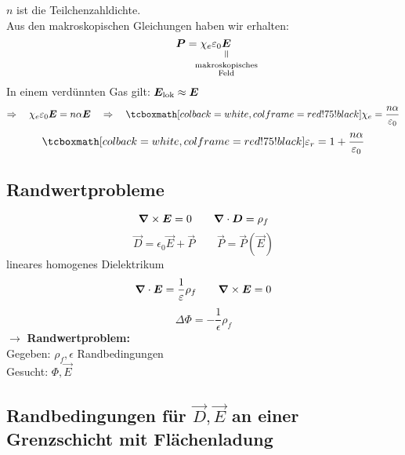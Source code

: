 \noindent
$ n $ ist die Teilchenzahldichte.\\
Aus den makroskopischen Gleichungen haben wir erhalten:
\begin{equation*}
\vec{P} = \chi_e \epsilon_0 \equalto{\vec{E}}{\mathclap{ \substack{\tx{makroskopisches} \\ \tx{Feld} }}}
\end{equation*}
In einem verdünnten Gas gilt: $ \bm{E}_{\textrm{lok}} \approx \bm{E} $
\begin{equation*}
\Rightarrow \quad \chi_e \epsilon_0 \vec{E} = n \alpha \vec{E} \quad \Rightarrow \quad \rmbox{\chi_e = \frac{n \alpha}{\epsilon_0}}
\end{equation*}
\begin{equation*}
\rmbox{\epsilon_r = 1 + \frac{n \alpha}{\epsilon_0}}
\end{equation*}

\subsection{Randwertprobleme}

\begin{equation*}
\bm{\nabla} \times \bm{E} = 0 \qquad \bm{\nabla} \cdot \bm{D} = \rho_f
\end{equation*}
\begin{equation*}
\vec{D} = \epsilon_0 \vec{E} + \vec{P} \qquad \vec{P} = \vec{P} (\vec{E})
\end{equation*}
lineares homogenes Dielektrikum
\begin{equation*}
\bm{\nabla} \cdot \bm{E} = \frac{1}{\varepsilon} \rho_f \qquad \bm{\nabla} \times \bm{E} = 0
\end{equation*}
\begin{equation*}
\Delta \Phi = - \frac{1}{\epsilon} \rho_f
\end{equation*}
$ \rightarrow $ \textbf{Randwertproblem:}\\
Gegeben: $ \rho_f , \epsilon $ Randbedingungen\\
Gesucht: $ \Phi, \vec{E} $

\subsection{Randbedingungen für \texorpdfstring{$ \vec{D}, \vec{E} $}{D E} an einer Grenzschicht mit Flächenladung}

